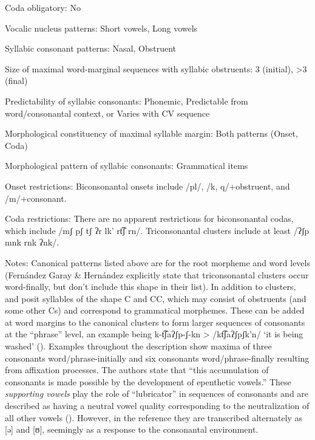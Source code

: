 {\begin{appendixdesc}
\item[Coda obligatory:] No

\item[Vocalic nucleus patterns:] Short vowels, Long vowels

\item[Syllabic consonant patterns:] Nasal, Obstruent

\item[Size of maximal word-marginal sequences with syllabic obstruents:] 3 (initial), >3 (final)

\item[Predictability of syllabic consonants:] Phonemic, Predictable from word/consonantal context, or Varies with CV sequence

\item[Morphological constituency of maximal syllable margin:] Both patterns (Onset, Coda)

\item[Morphological pattern of syllabic consonants:] Grammatical items

\item[Onset restrictions:] Biconsonantal onsets include /pl/, /k, q/+obstruent, and /m/+consonant.

\item[Coda restrictions:] There are no apparent restrictions for biconsonantal codas, which include /mʃ pʃ tʃ ʔr lk' rt͡ʃ rn/. Triconsonantal clusters include at least /ʔʃp mnk rnk ʔnk/.

\item[Notes:] Canonical patterns listed above are for the root morpheme and word levels (Fernández Garay \& Hernández explicitly state that triconsonantal clusters occur word-finally, but don’t include this shape in their list). In addition to clusters,  \citet{FernándezGaray1998} and  \citet{FernándezGarayHernández2006} posit syllables of the shape C and CC, which may consist of obstruents (and some other Cs) and correspond to grammatical morphemes. These can be added at word margins to the canonical clusters to form larger sequences of consonants at the “phrase” level, an example being k{}-t͡ʃaʔʃp{}-ʃ{}-kn > /kt͡ʃaʔʃpʃk’n/ ‘it is being washed’ (\citeyear[13]{FernándezGarayHernández2006}). Examples throughout the description show maxima of three consonants word/phrase-initially and six consonants word/phrase-finally resulting from affixation processes. The authors state that “this accumulation of consonants is made possible by the development of epenthetic vowels.” These \textit{supporting vowels} play the role of “lubricator” in sequences of consonants and are described as having a neutral vowel quality corresponding to the neutralization of all other vowels (\citeyear[13]{FernándezGarayHernández2006}). However, in the \citeyear{FernándezGaray1998} reference they are transcribed alternately as [ə] and [ʊ], seemingly as a response to the consonantal environment.
\end{appendixdesc}
}
